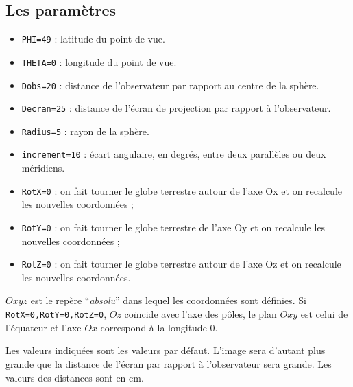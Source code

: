 \documentclass[11pt,french,BCOR10mm,DIV12,bibliography=totoc,parskip=false,
   smallheadings, headexclude,footexclude,oneside]{pst-doc}
\let\Parameter\texttt
\begin{document}
\subsection{Les paramètres}
\begin{itemize}
\item \Parameter{PHI=49} : latitude du point de vue.
\item \Parameter{THETA=0} : longitude du point de vue.
\item \Parameter{Dobs=20} : distance de l'observateur par rapport au centre de la sphère.
\item \Parameter{Decran=25} : distance de l'écran de projection par rapport à l'observateur.
\item \Parameter{Radius=5} : rayon de la sphère.
\item \Parameter{increment=10} : écart angulaire, en degrés, entre deux
parallèles ou deux méridiens.
\item \Parameter{RotX=0} : on fait tourner le globe terrestre autour de l'axe
\textsf{Ox} et on recalcule les nouvelles coordonnées ;
\item \Parameter{RotY=0} : on fait tourner le globe terrestre de l'axe
\textsf{Oy} et on recalcule les nouvelles coordonnées ;
\item \Parameter{RotZ=0} : on fait tourner le globe terrestre autour de l'axe
\textsf{Oz} et on recalcule les nouvelles coordonnées.
\end{itemize}
$Oxyz$ est le repère ``\textit{absolu}'' dans lequel les coordonnées sont
définies. Si \Parameter{RotX=0,RotY=0,RotZ=0}, $Oz$ coïncide avec l'axe des
pôles, le plan $Oxy$ est celui de l'équateur et l'axe $Ox$ correspond à
la longitude 0.

Les valeurs indiquées sont les valeurs par défaut. L'image sera d'autant
plus grande que la distance de l'écran par rapport à l'observateur sera
grande. Les valeurs des distances sont en \textsf{cm}.
\end{document}
